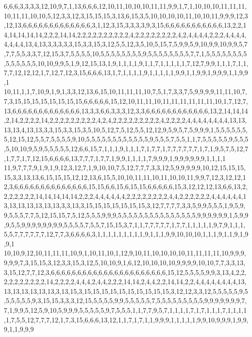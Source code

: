 6,6,6,3,3,3,3,12,10,9,7,1,13,6,6,6,12,10,11,10,10,10,11,11,9,9,1,7,1,10,10,10,11,11,11,10,11,11,10,10,5,12,3,3,12,3,15,15,15,3,13,6,15,3,5,10,10,10,10,11,10,10,11,9,9,9,12,3,12,13,6,6,6,6,6,6,6,6,6,6,6,6,6,3,1,12,3,15,3,3,3,3,9,3,15,6,6,6,6,6,6,6,6,6,6,6,13,2,2,14,14,14,14,14,2,2,2,14,14,2,2,2,2,2,2,2,2,2,2,4,2,2,2,2,2,2,2,2,4,2,4,4,4,4,2,2,2,4,4,4,4,4,4,4,4,13,4,13,3,3,3,3,3,15,3,3,15,3,12,5,5,12,3,5,10,5,15,7,5,9,9,5,9,10,9,9,10,9,9,5,7,7,7,5,5,3,3,7,12,15,3,7,5,5,5,5,10,5,5,5,5,5,5,5,5,9,5,5,5,5,5,5,5,5,7,7,1,5,5,5,5,5,5,5,5,5,5,5,5,5,5,10,10,9,9,5,1,9,12,15,13,1,9,1,1,1,1,9,1,1,7,1,1,1,1,1,7,12,7,9,9,1,1,1,7,1,1,7,7,12,12,12,1,7,12,7,12,3,15,6,6,6,13,1,7,1,1,1,1,9,1,1,1,1,1,9,9,1,1,9,9,1,9,9,9,1,1,9,9,1
10,11,1,1,7,10,9,1,9,1,3,3,12,13,6,15,10,11,11,11,10,7,5,1,7,3,3,7,5,9,9,9,9,11,11,10,7,7,3,15,15,15,15,15,15,15,15,6,6,6,6,6,15,12,10,11,11,10,11,11,11,11,11,11,10,1,7,12,7,13,6,6,6,6,6,6,6,6,6,6,6,6,6,13,3,3,6,6,3,3,3,12,3,3,6,6,6,6,6,6,6,6,6,6,6,6,13,2,14,14,14,2,14,2,2,2,2,14,2,2,2,2,2,2,2,2,2,4,2,4,2,2,2,2,2,2,2,2,2,4,2,2,2,2,4,4,4,4,4,4,4,4,13,13,13,13,4,13,13,3,3,15,3,3,15,3,5,10,5,12,7,5,12,5,5,12,12,9,5,9,5,7,5,9,9,9,1,5,5,5,5,5,5,5,12,15,12,5,5,7,5,5,5,5,9,10,5,5,5,5,5,5,5,5,5,5,5,5,9,5,5,5,7,5,5,1,1,7,5,5,5,5,5,9,5,5,5,5,10,10,9,5,9,5,5,5,5,5,12,6,6,15,7,1,1,1,9,1,1,1,7,1,7,7,1,7,7,7,7,7,7,1,7,1,9,5,7,5,12,7,1,7,7,1,7,12,15,6,6,6,6,13,7,7,7,1,7,7,1,9,9,1,1,1,1,7,9,9,9,1,9,9,9,9,9,9,1,1,1,1
11,9,7,7,7,9,1,9,1,9,12,3,12,7,1,9,10,10,7,5,12,7,7,7,3,3,12,5,9,9,9,9,9,10,12,15,15,15,15,3,3,13,13,6,15,15,15,12,12,13,6,15,5,10,10,11,11,10,11,10,10,11,9,9,7,12,3,12,12,12,3,6,6,6,6,6,6,6,6,6,6,6,6,6,6,15,15,6,6,15,6,15,15,6,6,6,6,6,15,3,12,12,12,13,6,6,13,2,2,2,2,2,2,2,14,14,14,14,14,2,2,2,4,4,4,4,4,4,2,2,2,2,2,2,2,2,4,4,2,2,2,2,2,2,4,4,4,4,4,4,13,13,13,13,13,13,13,3,3,13,3,15,15,15,15,15,15,15,3,12,7,7,7,7,3,3,5,9,9,5,5,5,1,9,5,9,9,5,5,5,7,7,5,12,15,15,7,5,12,5,5,5,9,9,9,5,5,5,5,5,5,5,5,5,5,5,5,5,5,5,9,9,9,9,9,9,1,5,9,9,9,5,5,9,9,9,9,9,9,9,9,5,5,5,5,7,5,5,7,15,15,3,7,1,1,7,7,7,7,7,1,7,7,1,1,1,1,1,9,7,9,1,1,1,5,5,7,7,7,7,7,7,12,7,7,3,6,6,6,6,3,1,1,1,1,1,1,1,1,1,9,1,1,1,9,9,10,10,10,1,1,1,9,1,1,9,1,9,9,1
10,10,9,12,10,11,11,11,10,9,1,10,11,10,1,12,9,10,11,10,10,10,10,11,11,11,11,10,9,9,9,9,9,9,7,3,15,15,3,12,3,3,15,3,12,5,10,10,9,1,6,12,10,10,10,10,9,9,9,9,10,10,7,7,3,3,13,3,15,12,7,7,12,3,6,6,6,6,6,6,6,6,6,6,6,6,6,6,6,6,6,6,6,6,6,6,15,12,5,5,5,5,9,9,3,13,4,2,2,2,2,2,2,2,2,2,2,14,2,2,2,2,4,4,4,2,4,4,2,2,2,14,14,2,4,4,2,2,14,14,2,2,4,4,4,4,4,4,4,4,13,13,13,13,13,13,13,3,13,15,3,15,15,15,15,15,15,15,15,15,15,3,12,12,3,3,12,5,5,5,5,5,9,5,5,5,5,5,5,9,3,15,15,3,3,3,12,15,5,5,5,5,9,9,5,5,5,5,5,7,5,5,5,5,5,5,5,5,5,9,9,9,9,9,9,9,7,7,1,9,9,5,12,5,9,10,5,9,9,9,5,5,5,5,5,9,7,5,5,5,1,1,7,7,9,5,7,1,1,1,1,7,1,7,1,1,1,7,1,1,1,1,1,7,5,5,12,7,7,7,12,1,7,3,15,6,6,6,13,12,1,1,7,1,7,1,1,9,9,9,1,1,1,1,1,9,9,10,9,9,9,1,9,9,9,1,1,9,9,9
